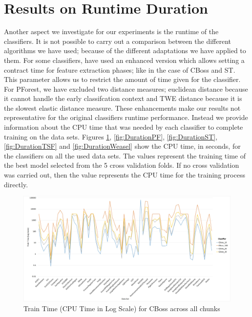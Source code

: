 \section{Results on Runtime Duration}
\label{SectionRuntime}
Another aspect we investigate for our experiments is the runtime of the classifiers.
It is not possible to carry out a comparison between the different algorithms we have used; because of the different adaptations we have applied to them.
For some classifiers, have used an enhanced version which allows setting a contract time for feature extraction phases; like in the case of CBoss and ST.
This parameter allows us to restrict the amount of time given for the classifier.
For PForest, we have excluded two distance measures; euclidean distance because it cannot handle the early classifcation context
and TWE distance because it is the slowest elastic distance measure.
These enhancements make our results not representative for the original classifiers runtime performance.
Instead we provide information about the CPU time that was needed by each classifier to complete training on the data sets.
Figures \ref{fig:DurationCBoss}, \ref{fig:DurationPF}, \ref{fig:DurationST}, \ref{fig:DurationTSF} and \ref{fig:DurationWeasel} show the CPU time, in seconds, for the classifiers on all the used data sets.
The values represent the training time of the best model selected from the 5 cross validation folds.
If no cross validation was carried out, then the value represents the CPU time for the training process directly.

\begin{figure} [!htb]
  \centering
  \includegraphics[width=\textwidth]{Duration_cboss.jpg}
  \caption{Train Time (CPU Time in Log Scale) for CBoss across all chunks}
  \label{fig:DurationCBoss}
\end{figure}

